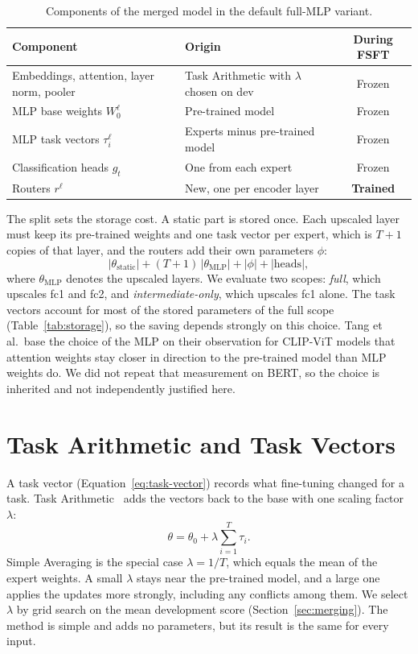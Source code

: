 \begin{table}[htbp]
  \centering\tablestyle
  \caption{Components of the merged model in the default full-MLP variant.}
  \label{tab:components}
  \begin{tabularx}{\linewidth}{l X c}
    \toprule
    Component & Origin & During FSFT\\
    \midrule
    Embeddings, attention, layer norm, pooler & Task Arithmetic with $\lambda$ chosen on dev & Frozen\\
    MLP base weights $W_0^{\ell}$ & Pre-trained model & Frozen\\
    MLP task vectors $\tau_i^{\ell}$ & Experts minus pre-trained model & Frozen\\
    Classification heads $g_t$ & One from each expert & Frozen\\
    Routers $r^{\ell}$ & New, one per encoder layer & \textbf{Trained}\\
    \bottomrule
  \end{tabularx}
\end{table}

The split sets the storage cost. A static part is stored once. Each upscaled layer must keep its pre-trained weights and one task vector per expert, which is $T+1$ copies of that layer, and the routers add their own parameters $\phi$:
\begin{equation}
|\theta_{\mathrm{static}}|+(T+1)\,|\theta_{\mathrm{MLP}}|+|\phi|+|\mathrm{heads}|,
\label{eq:storage}
\end{equation}
where $\theta_{\mathrm{MLP}}$ denotes the upscaled layers. We evaluate two scopes: \emph{full}, which upscales fc1 and fc2, and \emph{intermediate-only}, which upscales fc1 alone. The task vectors account for most of the stored parameters of the full scope (Table~\ref{tab:storage}), so the saving depends strongly on this choice. Tang et al.\ base the choice of the MLP on their observation for CLIP-ViT models that attention weights stay closer in direction to the pre-trained model than MLP weights do. We did not repeat that measurement on BERT, so the choice is inherited and not independently justified here.

\section{Task Arithmetic and Task Vectors}
\label{sec:ta}

A task vector (Equation~\ref{eq:task-vector}) records what fine-tuning changed for a task. Task Arithmetic~\cite{ilharco2023task} adds the vectors back to the base with one scaling factor $\lambda$:
\begin{equation}
\theta=\theta_0+\lambda\sum_{i=1}^{T}\tau_i .
\label{eq:ta}
\end{equation}
Simple Averaging is the special case $\lambda=1/T$, which equals the mean of the expert weights. A small $\lambda$ stays near the pre-trained model, and a large one applies the updates more strongly, including any conflicts among them. We select $\lambda$ by grid search on the mean development score (Section~\ref{sec:merging}). The method is simple and adds no parameters, but its result is the same for every input.

